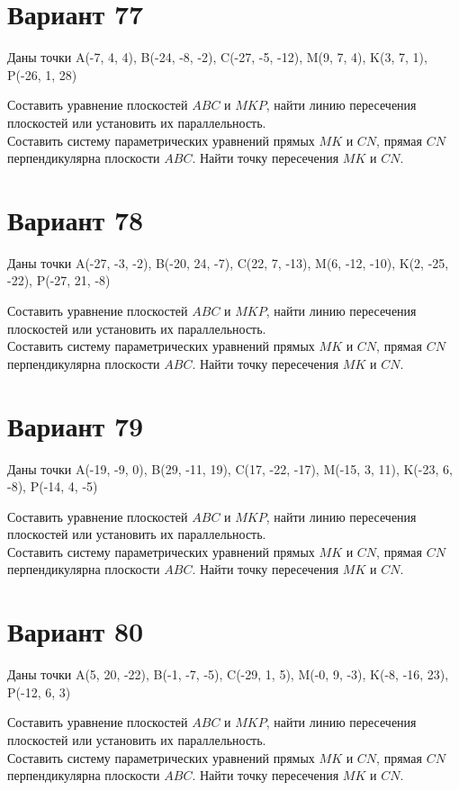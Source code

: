 \documentclass[11pt]{article}
\begin{document}
\section*{Вариант 77}
Даны точки A(-7, 4, 4), B(-24, -8, -2), C(-27, -5, -12), M(9, 7, 4), K(3, 7, 1), P(-26, 1, 28)

Составить уравнение плоскостей $ABC$ и $MKP$, найти линию пересечения плоскостей или установить их параллельность.\\
Составить систему параметрических уравнений прямых $MK$ и $CN$, прямая $CN$ перпендикулярна плоскости $ABC$. Найти точку пересечения $MK$ и $CN$.

\section*{Вариант 78}
Даны точки A(-27, -3, -2), B(-20, 24, -7), C(22, 7, -13), M(6, -12, -10), K(2, -25, -22), P(-27, 21, -8)

Составить уравнение плоскостей $ABC$ и $MKP$, найти линию пересечения плоскостей или установить их параллельность.\\
Составить систему параметрических уравнений прямых $MK$ и $CN$, прямая $CN$ перпендикулярна плоскости $ABC$. Найти точку пересечения $MK$ и $CN$.

\section*{Вариант 79}
Даны точки A(-19, -9, 0), B(29, -11, 19), C(17, -22, -17), M(-15, 3, 11), K(-23, 6, -8), P(-14, 4, -5)

Составить уравнение плоскостей $ABC$ и $MKP$, найти линию пересечения плоскостей или установить их параллельность.\\
Составить систему параметрических уравнений прямых $MK$ и $CN$, прямая $CN$ перпендикулярна плоскости $ABC$. Найти точку пересечения $MK$ и $CN$.

\section*{Вариант 80}
Даны точки A(5, 20, -22), B(-1, -7, -5), C(-29, 1, 5), M(-0, 9, -3), K(-8, -16, 23), P(-12, 6, 3)

Составить уравнение плоскостей $ABC$ и $MKP$, найти линию пересечения плоскостей или установить их параллельность.\\
Составить систему параметрических уравнений прямых $MK$ и $CN$, прямая $CN$ перпендикулярна плоскости $ABC$. Найти точку пересечения $MK$ и $CN$.
\end{document}
